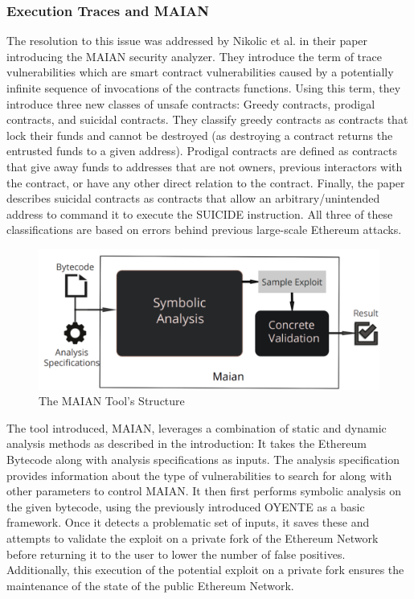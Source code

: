 \documentclass[letterpaper,twocolumn,10pt]{article}
\begin{document}
\subsubsection{Execution Traces and MAIAN}
The resolution to this issue was addressed by Nikolic et al. in their paper introducing the MAIAN security analyzer. They introduce the term of trace vulnerabilities which are smart contract vulnerabilities caused by a potentially infinite sequence of invocations of the contracts functions. Using this term, they introduce three new classes of unsafe contracts: Greedy contracts, prodigal contracts, and suicidal contracts. They classify greedy contracts as contracts that lock their funds and cannot be destroyed (as destroying a contract returns the entrusted funds to a given address). Prodigal contracts are defined as contracts that give away funds to addresses that are not owners, previous interactors with the contract, or have any other direct relation to the contract. Finally, the paper describes suicidal contracts as contracts that allow an arbitrary/unintended address to command it to execute the SUICIDE instruction. All three of these classifications are based on errors behind previous large-scale Ethereum attacks. 

\begin{figure}
\begin{center}
\includegraphics[scale=0.2]{MAIAN}
\end{center}
\caption{\label{fig:oyente} The MAIAN Tool's Structure}
\end{figure}

The tool introduced, MAIAN, leverages a combination of static and dynamic analysis methods as described in the introduction: It takes the Ethereum Bytecode along with analysis specifications as inputs. The analysis specification provides information about the type of vulnerabilities to search for along with other parameters to control MAIAN. It then first performs symbolic analysis on the given bytecode, using the previously introduced OYENTE as a basic framework. Once it detects a problematic set of inputs, it saves these and attempts to validate the exploit on a private fork of the Ethereum Network before returning it to the user to lower the number of false positives. Additionally, this execution of the potential exploit on a private fork ensures the maintenance of the state of the public Ethereum Network.
\end{document}
